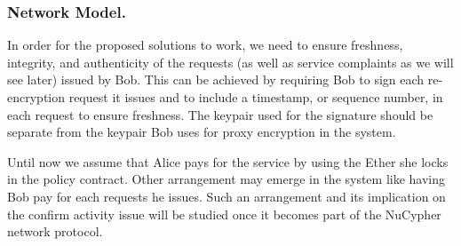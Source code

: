 \subsubsection{Network Model.}
In order for the proposed solutions to work, we need to ensure freshness, 
integrity, and authenticity of the requests (as well as service complaints as we will see later) issued by Bob. This can be achieved 
by requiring Bob to sign each re-encryption request it issues and to include a timestamp, or 
sequence number, in each request to ensure freshness. The keypair used for the 
signature should be separate from the keypair Bob uses for proxy encryption in the 
system. 


Until now we assume that Alice pays for the service by using the Ether she locks 
in the policy contract. Other arrangement may emerge in the system like having 
Bob pay for each requests he issues. Such an arrangement and its implication on the 
confirm activity issue will be studied once it becomes part of the NuCypher 
network protocol.


